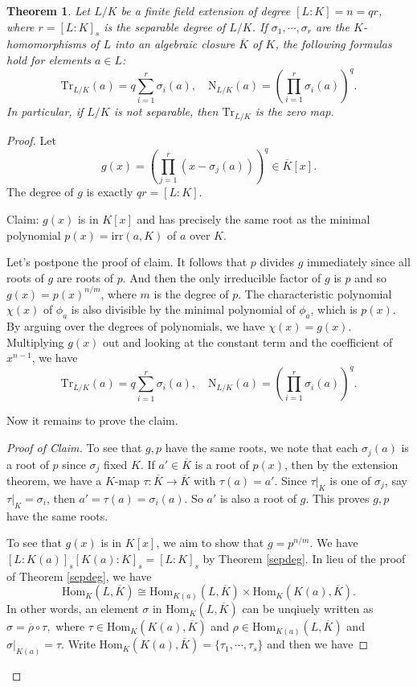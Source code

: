 \documentclass[12pt]{report}
\newtheorem{theorem}{Theorem}[section]
\theoremstyle{definition}
\newcommand{\Hom}{\text{Hom}}
\newcommand{\irr}{\text{irr}}
\newcommand{\ok}{\overline{K}}
\newcommand{\Tr}{\text{Tr}}
\newcommand{\nm}{\text{N}}
\begin{document}
\begin{theorem}\label{trnmfor}
	Let $L/K$ be a finite field extension of degree $[L : K] =n= qr$, where $r = [L : K]_s$ is the separable degree of $L/K$. If $\sigma_1, \cdots , \sigma_r$ are the $K$-homomorphisms of $L$ into an algebraic closure $\overline{K}$ of $K$, the following formulas hold for elements $a \in L$: $$\Tr_{L/K}(a)=q\sum_{i=1}^r \sigma_i(a),\quad \nm_{L/K}(a) = (\prod_{i=1}^r \sigma_i(a))^q. $$
	In particular, if $L/K$ is not separable, then $\Tr_{L/K}$ is the zero map.
\end{theorem}

\begin{proof}
	Let $$g(x)=(\prod_{j=1}^r(x-\sigma_j(a)))^q \in \ok[x].$$ The degree of $g$ is exactly $qr=[L:K]$.

	Claim: $g(x)$ is in $K[x]$ and has precisely the same root as the minimal polynomial $p(x)=\irr(a,K)$ of $a$ over $K$.

	Let's postpone the proof of claim. It follows that $p$ divides $g$ immediately since all roots of $g$ are roots of $p$.  And then the only irreducible factor of $g$ is $p$ and so $g(x)=p(x)^{n/m}$, where $m$ is the degree of $p$. The characteristic polynomial $\chi(x)$ of $\phi_a$ is also divisible by the minimal polynomial of $\phi_a$, which is $p(x)$. By arguing over the degrees of polynomials, we have $\chi(x)=g(x)$. Multiplying $g(x)$ out and looking at the constant term and the coefficient of $x^{n-1}$, we have $$\Tr_{L/K}(a)=q\sum_{i=1}^r \sigma_i(a),\quad \nm_{L/K}(a) = (\prod_{i=1}^r \sigma_i(a))^q. $$

	Now it remains to prove the claim.
	\begin{proof}[Proof of Claim]
		To see that $g,p$ have the same roots, we note that each $\sigma_j(a)$ is a root of $p$ since $\sigma_j$ fixed $K$. If $a'\in \ok$ is a root of $p(x)$, then by the extension theorem, we have a $K$-map $\tau:\ok\to \ok$ with $\tau(a)=a'$. Since $\tau|_K$ is one of $\sigma_j$, say $\tau|_K=\sigma_i$, then $a'=\tau(a)=\sigma_i(a)$. So $a'$ is also a root of $g$. This proves $g,p$ have the same roots.

		To see that $g(x)$ is in $K[x]$, we aim to show that $g=p^{n/m}$. We have $[L:K(a)]_s [K(a):K]_s=[L:K]_s$ by Theorem \ref{sepdeg}. In lieu of the proof of Theorem \ref{sepdeg}, we have $$\Hom_K(L,\ok)\cong \Hom_{K(a)}(L,\ok)\times\Hom_K(K(a),\ok).$$ In other words, an element $\sigma$ in $\Hom_K(L,\ok)$ can be unqiuely written as $\sigma = \overline{\rho}\circ\tau,$ where $\tau\in\Hom_K(K(a),\ok)$ and $\rho\in  \Hom_{K(a)}(L,\ok)$ and $\sigma|_{K(a)}=\tau$. Write $\Hom_K(K(a),\ok)=\{\tau_1,\cdots,\tau_s\}$ and then we have


\end{proof}
\end{proof}
\end{document}
